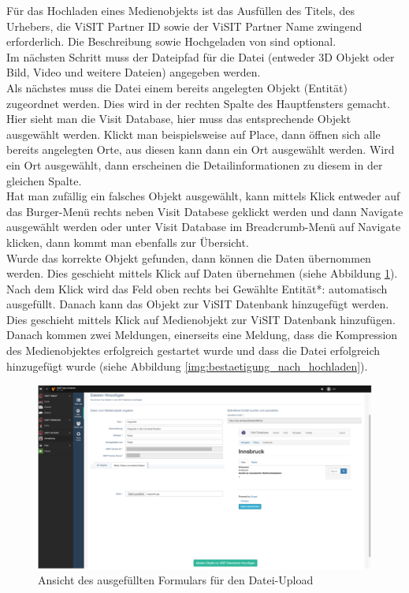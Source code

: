 Für das Hochladen eines Medienobjekts ist das Ausfüllen des Titels, des Urhebers, die ViSIT Partner ID sowie der ViSIT Partner Name zwingend erforderlich. Die \glqq Beschreibung\grqq{} sowie \glqq Hochgeladen\grqq{} von sind optional.\\
Im nächsten Schritt muss der Dateipfad für die Datei (entweder 3D Objekt oder Bild, Video und weitere Dateien) angegeben werden.\\
Als nächstes muss die Datei einem bereits angelegten Objekt (Entität) zugeordnet werden. Dies wird in der rechten Spalte des Hauptfensters gemacht. Hier sieht man die Visit Database, hier muss das entsprechende Objekt ausgewählt werden. Klickt man beispielsweise auf \glqq Place\grqq{}, dann öffnen sich alle bereits angelegten Orte, aus diesen kann dann ein Ort ausgewählt werden. Wird ein Ort ausgewählt, dann erscheinen die Detailinformationen zu diesem in der gleichen Spalte.\\

Hat man zufällig ein falsches Objekt ausgewählt, kann mittels Klick entweder auf das Burger-Menü rechts neben Visit Databese geklickt werden und dann Navigate ausgewählt werden oder unter Visit Database im Breadcrumb-Menü auf Navigate klicken, dann kommt man ebenfalls zur Übersicht.\\

Wurde das korrekte Objekt gefunden, dann können die Daten übernommen werden. Dies geschieht mittels Klick auf \glqq Daten übernehmen\grqq{} (siehe Abbildung \ref{img:datei_hochladen_ausgefuellt}). Nach dem Klick wird das Feld oben rechts bei \glqq Gewählte Entität*:\grqq{} automatisch ausgefüllt. Danach kann das Objekt zur ViSIT Datenbank hinzugefügt werden. Dies geschieht mittels Klick auf \glqq Medienobjekt zur ViSIT Datenbank hinzufügen\grqq{}. Danach kommen zwei Meldungen, einerseits eine Meldung, dass die Kompression des Medienobjektes erfolgreich gestartet wurde und dass die Datei erfolgreich hinzugefügt wurde (siehe Abbildung \ref{img:bestaetigung_nach_hochladen}).

\begin{figure}[ht!]
\centering
\includegraphics[width=12cm]{Figures/paula/dateiverwaltung/datei_hochladen_ausgefuellt.png}
\caption{Ansicht des ausgefüllten Formulars für den Datei-Upload}
\label{img:datei_hochladen_ausgefuellt}
\end{figure}

